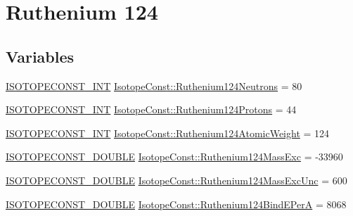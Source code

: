 \hypertarget{group___isotope_const-_ruthenium-_ru124}{}\section{Ruthenium 124}
\label{group___isotope_const-_ruthenium-_ru124}
\subsection*{Variables}
\begin{DoxyCompactItemize}
\item 
\mbox{\hyperlink{group___isotope_const-_macros_ga5f18360b3e99483a35c32d789e62621c}{I\+S\+O\+T\+O\+P\+E\+C\+O\+N\+S\+T\+\_\+\+I\+NT}} \mbox{\hyperlink{group___isotope_const-_ruthenium-_ru124_ga606417a0e837a70e008f95e4cfc8e096}{Isotope\+Const\+::\+Ruthenium124\+Neutrons}} = 80
\item 
\mbox{\hyperlink{group___isotope_const-_macros_ga5f18360b3e99483a35c32d789e62621c}{I\+S\+O\+T\+O\+P\+E\+C\+O\+N\+S\+T\+\_\+\+I\+NT}} \mbox{\hyperlink{group___isotope_const-_ruthenium-_ru124_gad3b2789afe3bcc988369cd1558b7e62d}{Isotope\+Const\+::\+Ruthenium124\+Protons}} = 44
\item 
\mbox{\hyperlink{group___isotope_const-_macros_ga5f18360b3e99483a35c32d789e62621c}{I\+S\+O\+T\+O\+P\+E\+C\+O\+N\+S\+T\+\_\+\+I\+NT}} \mbox{\hyperlink{group___isotope_const-_ruthenium-_ru124_ga15e401b041eab92a1530f659994024e8}{Isotope\+Const\+::\+Ruthenium124\+Atomic\+Weight}} = 124
\item 
\mbox{\hyperlink{group___isotope_const-_macros_ga8f45a7272ce02c0b4c65c44636ed719a}{I\+S\+O\+T\+O\+P\+E\+C\+O\+N\+S\+T\+\_\+\+D\+O\+U\+B\+LE}} \mbox{\hyperlink{group___isotope_const-_ruthenium-_ru124_ga38f24c030425b64ac26f88bc95dd68eb}{Isotope\+Const\+::\+Ruthenium124\+Mass\+Exc}} = -\/33960
\item 
\mbox{\hyperlink{group___isotope_const-_macros_ga8f45a7272ce02c0b4c65c44636ed719a}{I\+S\+O\+T\+O\+P\+E\+C\+O\+N\+S\+T\+\_\+\+D\+O\+U\+B\+LE}} \mbox{\hyperlink{group___isotope_const-_ruthenium-_ru124_gad06f5f241568c32bde6b58aafd143de0}{Isotope\+Const\+::\+Ruthenium124\+Mass\+Exc\+Unc}} = 600
\item 
\mbox{\hyperlink{group___isotope_const-_macros_ga8f45a7272ce02c0b4c65c44636ed719a}{I\+S\+O\+T\+O\+P\+E\+C\+O\+N\+S\+T\+\_\+\+D\+O\+U\+B\+LE}} \mbox{\hyperlink{group___isotope_const-_ruthenium-_ru124_ga8576757c9bdcaf62afb89c87ae7b1c54}{Isotope\+Const\+::\+Ruthenium124\+Bind\+E\+PerA}} = 8068
\item 

\end{DoxyCompactItemize}
